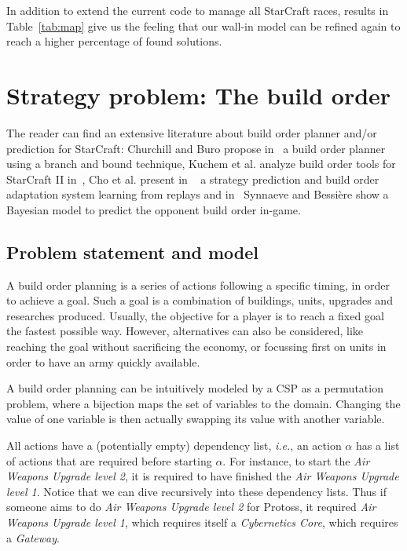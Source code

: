 \documentclass{article}
\newcommand{\csp}{\textsc{CSP}\xspace}
\newcommand{\ie}{\textit{i.e.}}
\begin{document}
In addition to extend the current  code to manage all StarCraft races,
results in  Table~\ref{tab:map} give us  the feeling that  our wall-in
model  can be  refined again  to reach  a higher  percentage of  found
solutions.


\section{Strategy problem: The build order}\label{sec:bo}

The reader can find an  extensive literature about build order planner
and/or   prediction  for   StarCraft:  Churchill   and  Buro   propose
in~\cite{ChurchillB11} a build order planner  using a branch and bound
technique, Kuchem  et al. analyze  build order tools for  StarCraft II
in~\cite{KuchemPR13},  Cho  et  al.    present  in  ~\cite{ChoKC13}  a
strategy prediction  and build  order adaptation system  learning from
replays and  in~\cite{SynnaeveB11-a} Synnaeve and Bessi{\`e}re  show a
Bayesian model to predict the opponent build order in-game.

\subsection{Problem statement and model}
A build  order planning is  a series  of actions following  a specific
timing, in order to  achieve a goal.  Such a goal  is a combination of
buildings,  units, upgrades  and  researches  produced.  Usually,  the
objective for a  player is to reach a fixed  goal the fastest possible
way. However, alternatives  can also be considered,  like reaching the
goal without sacrificing  the economy, or focussing first  on units in
order to have an army quickly available.

A  build order  planning can  be intuitively  modeled by  a \csp  as a
permutation problem,  where a bijection  maps the set of  variables to
the  domain. Changing  the  value  of one  variable  is then  actually
swapping its value with another variable.

All actions have a (potentially empty) dependency list, \ie, an action
$\alpha$  has a  list of  actions  that are  required before  starting
$\alpha$.   For instance,  to  start the  \textit{Air Weapons  Upgrade
  level 2},  it is required  to have finished the  \textit{Air Weapons
  Upgrade level  1}. Notice  that we can  dive recursively  into these
dependency  lists.  Thus  if someone  aims to  do \textit{Air  Weapons
  Upgrade  level  2}  for  Protoss, it  required  \textit{Air  Weapons
  Upgrade level 1}, which requires itself a \textit{Cybernetics Core},
which requires a \textit{Gateway}.
\end{document}
